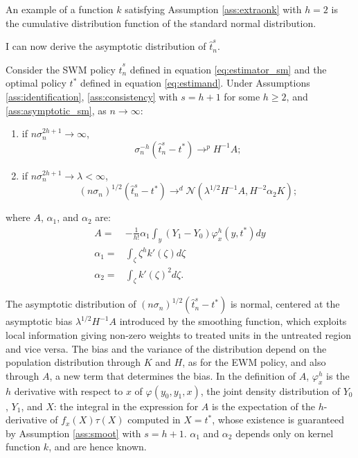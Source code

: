 {An example of a function $k$ satisfying Assumption \ref{ass:extraonk} with $h=2$ is the cumulative distribution function of the standard normal distribution.

I can now derive the asymptotic distribution of $\hat{t}^s_n$.
\begin{thm} \label{thm:asynormsmooth}
    Consider the SWM policy $\hat{t}^s_n$ defined in equation \eqref{eq:estimator_sm} and the optimal policy $t^*$ defined in equation \eqref{eq:estimand}. Under Assumptions \ref{ass:identification}, \ref{ass:consistency} with $s=h + 1$ for some $h\geq 2$, and \ref{ass:asymptotic_sm}, as $n \rightarrow \infty$:
    \begin{enumerate}
        \item if $n \sigma_n^{2h + 1} \rightarrow \infty$, $$\sigma_n^{-h}(\hat{t}^s_n - t^*) \rightarrow^p H^{-1}A;$$
        \item  if $n \sigma_n^{2h + 1} \rightarrow \lambda < \infty$, $$(n\sigma_n)^{1/2}(\hat{t}^s_n - t^*) \rightarrow^d \mathcal{N}(\lambda^{1/2}H^{-1}A, H^{-2}\alpha_2 K);$$
    \end{enumerate}
    where $A$, $\alpha_1$, and $\alpha_2$ are:
    \begin{align}
    A =& -\frac{1}{h!} \alpha_1 \int_y \left(Y_1 - Y_0 \right) \varphi^{h}_x(y,t^*) d y \\
    \alpha_1 =& \int_\zeta \zeta^h k'\left(\zeta \right) d \zeta \\
    \alpha_2 =& \int_\zeta k'\left(\zeta \right)^2 d \zeta.
\end{align}
\end{thm}

The asymptotic distribution of $(n\sigma_n)^{1/2}(\hat{t}^s_n - t^*)$ is normal, centered at the asymptotic bias $\lambda^{1/2}H^{-1}A$ introduced by the smoothing function, which exploits local information giving non-zero weights to treated units in the untreated region and vice versa. The bias and the variance of the distribution depend on the population distribution through $K$ and $H$, as for the EWM policy, and also through $A$, a new term that determines the bias. In the definition of $A$, $\varphi^{h}_x$ is the $h$ derivative with respect to $x$ of $\varphi(y_0,y_1,x)$, the joint density distribution of $Y_0$, $Y_1$, and $X$: the integral in the expression for $A$ is the expectation of the $h$-derivative of $f_x(X) \tau(X)$ computed in $X=t^*$, whose existence is guaranteed by Assumption \ref{ass:smoot} with $s=h+1$. $\alpha_1$ and $\alpha_2$ depends only on kernel function $k$, and are hence known.

}
